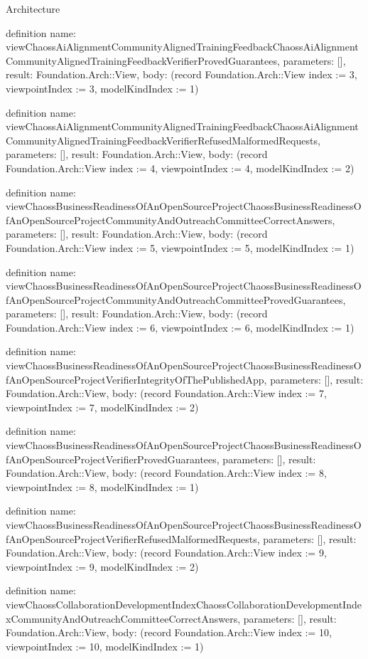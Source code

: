 \begin{lexlean}{Architecture}
\begin{semanticmodule}
definition{
  name: viewChaossAiAlignmentCommunityAlignedTrainingFeedbackChaossAiAlignmentCommunityAlignedTrainingFeedbackVerifierProvedGuarantees,
  parameters: [],
  result: Foundation.Arch::View,
  body: (record Foundation.Arch::View {index := 3, viewpointIndex := 3, modelKindIndex := 1})
}

definition{
  name: viewChaossAiAlignmentCommunityAlignedTrainingFeedbackChaossAiAlignmentCommunityAlignedTrainingFeedbackVerifierRefusedMalformedRequests,
  parameters: [],
  result: Foundation.Arch::View,
  body: (record Foundation.Arch::View {index := 4, viewpointIndex := 4, modelKindIndex := 2})
}

definition{
  name: viewChaossBusinessReadinessOfAnOpenSourceProjectChaossBusinessReadinessOfAnOpenSourceProjectCommunityAndOutreachCommitteeCorrectAnswers,
  parameters: [],
  result: Foundation.Arch::View,
  body: (record Foundation.Arch::View {index := 5, viewpointIndex := 5, modelKindIndex := 1})
}

definition{
  name: viewChaossBusinessReadinessOfAnOpenSourceProjectChaossBusinessReadinessOfAnOpenSourceProjectCommunityAndOutreachCommitteeProvedGuarantees,
  parameters: [],
  result: Foundation.Arch::View,
  body: (record Foundation.Arch::View {index := 6, viewpointIndex := 6, modelKindIndex := 1})
}

definition{
  name: viewChaossBusinessReadinessOfAnOpenSourceProjectChaossBusinessReadinessOfAnOpenSourceProjectVerifierIntegrityOfThePublishedApp,
  parameters: [],
  result: Foundation.Arch::View,
  body: (record Foundation.Arch::View {index := 7, viewpointIndex := 7, modelKindIndex := 2})
}

definition{
  name: viewChaossBusinessReadinessOfAnOpenSourceProjectChaossBusinessReadinessOfAnOpenSourceProjectVerifierProvedGuarantees,
  parameters: [],
  result: Foundation.Arch::View,
  body: (record Foundation.Arch::View {index := 8, viewpointIndex := 8, modelKindIndex := 1})
}

definition{
  name: viewChaossBusinessReadinessOfAnOpenSourceProjectChaossBusinessReadinessOfAnOpenSourceProjectVerifierRefusedMalformedRequests,
  parameters: [],
  result: Foundation.Arch::View,
  body: (record Foundation.Arch::View {index := 9, viewpointIndex := 9, modelKindIndex := 2})
}

definition{
  name: viewChaossCollaborationDevelopmentIndexChaossCollaborationDevelopmentIndexCommunityAndOutreachCommitteeCorrectAnswers,
  parameters: [],
  result: Foundation.Arch::View,
  body: (record Foundation.Arch::View {index := 10, viewpointIndex := 10, modelKindIndex := 1})
}


\end{semanticmodule}
\end{lexlean}

